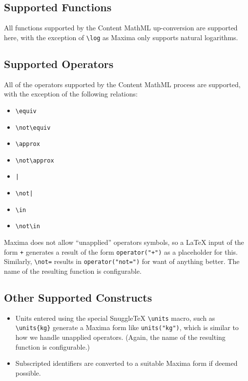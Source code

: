 \subsection*{Supported Functions}

All functions supported by the Content MathML up-conversion are supported
here, with the exception of \verb|\log| as Maxima only supports natural
logarithms.

\subsection*{Supported Operators}

All of the operators supported by the Content MathML process are
supported, with the exception of the following relations:

\begin{itemize}
  \item \verb|\equiv|
  \item \verb|\not\equiv|
  \item \verb|\approx|
  \item \verb|\not\approx|
  \item \verb.|.
  \item \verb.\not|.
  \item \verb|\in|
  \item \verb|\not\in|
\end{itemize}

Maxima does not allow ``unapplied'' operators symbols, so a LaTeX input
of the form \verb|+| generates a result of the form \verb|operator("+")|
as a placeholder for this. Similarly, \verb|\not=| results in
\verb|operator("not=")| for want of anything better.
The name of the resulting function is configurable.

\subsection*{Other Supported Constructs}

\begin{itemize}
\item
  Units entered using the special SnuggleTeX \verb|\units| macro, such as
  \verb|\units{kg}| generate a Maxima form like \verb|units("kg")|, which
  is similar to how we handle unapplied operators. (Again, the name of
  the resulting function is configurable.)

\item
  Subscripted identifiers are converted to a suitable Maxima form if
  deemed possible.
\end{itemize}

